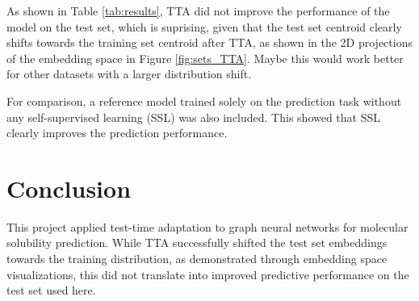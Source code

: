 \documentclass[11pt,a4paper]{article}
\begin{document}
As shown in Table \ref{tab:results}, TTA did not improve the performance of the model on the test set, which is suprising, given that the test set centroid clearly shifts towards the training set centroid after TTA, as shown in the 2D projections of the embedding space in Figure \ref{fig:sets_TTA}. Maybe this would work better for other datasets with a larger distribution shift.

For comparison, a reference model trained solely on the prediction task without any self-supervised learning (SSL) was also included. This showed that SSL clearly improves the prediction performance.

\section{Conclusion}

This project applied test-time adaptation to graph neural networks for molecular solubility prediction. While TTA successfully shifted the test set embeddings towards the training distribution, as demonstrated through embedding space visualizations, this did not translate into improved predictive performance on the test set used here.



\end{document}
